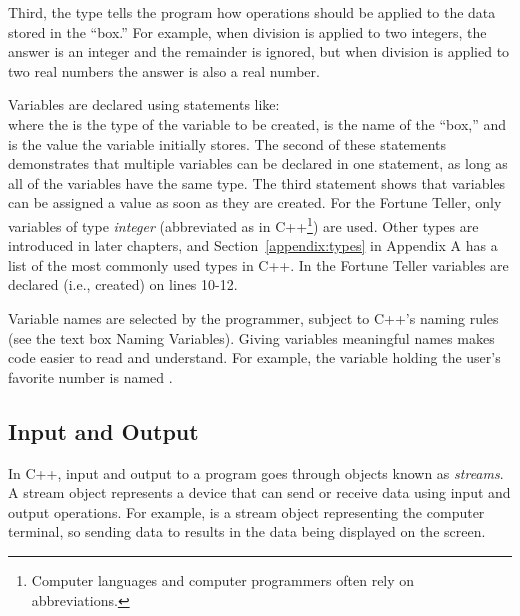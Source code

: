 Third, the type tells the program how operations should be applied to the data stored in the ``box.''  For example, when division is applied to two integers, the answer is an integer and the remainder is ignored, but when division is applied to two real numbers the answer is also a real number.

Variables are declared using statements like:\\
where the  is the type of the variable to be created,  is the name of the ``box,'' and  is the value the variable initially stores.  
The second of these statements demonstrates that multiple variables can be declared in one statement, as long as all of the variables have the same type.  The third statement shows that variables can be assigned a value as soon as they are created.
For the Fortune Teller, only variables of type \emph{integer} (abbreviated as  in C++\footnote{Computer languages and computer programmers often rely on abbreviations.}) are used.  Other types are introduced in later chapters, and Section~\ref{appendix:types} in Appendix A has a list of the most commonly used types in C++.  In the Fortune Teller variables are declared (i.e., created) on lines 10-12.

Variable names are selected by the programmer, subject to C++'s naming rules (see the text box Naming Variables).   Giving variables meaningful names makes code easier to read and understand. For example, the variable holding the user's favorite number is named . 

\subsection{Input and Output}

In C++, input and output to a program goes through objects known as  \emph{streams}.  A stream object represents a device that can send or receive data using input and output operations.  For example,  is a stream object representing the computer terminal, so sending data to  results in the data being displayed on the screen.  

